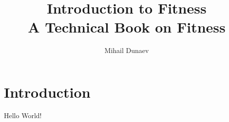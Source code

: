 \documentclass[openany]{book}
\title{
  Introduction to Fitness \\
  \vskip 0.5cm
  \small A Technical Book on Fitness}
\author{Mihail Dunaev}
\date{}
\begin{document}
  \maketitle
  \tableofcontents
  \chapter{Introduction}
  Hello World!
\end{document}

